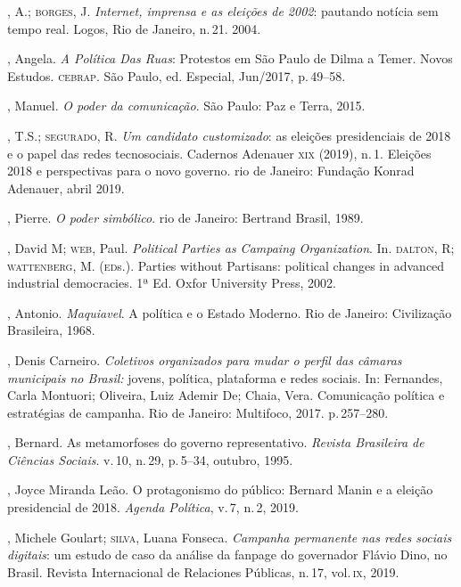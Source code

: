 \begin{bibliohedra}
, A.; \textsc{borges}, J. \textit{Internet, imprensa e as eleições de 2002}:
pautando notícia sem tempo real. Logos, Rio de Janeiro, n.\,21. 2004.

, Angela. \textit{A Política Das Ruas}: Protestos em São Paulo de
Dilma a Temer. Novos Estudos. \textsc{cebrap}. São Paulo, ed. Especial, Jun/2017,
p.\,49--58.

, Manuel. \textit{O poder da comunicação}. São Paulo: Paz e
Terra, 2015.

, T.S.; \textsc{segurado}, R. \textit{Um candidato customizado}: as
eleições presidenciais de 2018 e o papel das redes tecnosociais.
Cadernos Adenauer \textsc{xix} (2019), n.\,1. Eleições 2018 e perspectivas para o
novo governo. rio de Janeiro: Fundação Konrad Adenauer, abril 2019.

, Pierre. \textit{O poder simbólico}. rio de Janeiro: Bertrand
Brasil, 1989.

, David M; \textsc{web}, Paul. \textit{Political Parties as Campaing
Organization}. In. \textsc{dalton}, R; \textsc{wattenberg}, M. (\textsc{ed}s.). Parties without
Partisans: political changes in advanced industrial democracies. 1ª Ed.
Oxfor University Press, 2002.

, Antonio. \textit{Maquiavel}. A política e o Estado Moderno. Rio
de Janeiro: Civilização Brasileira, 1968.

, Denis Carneiro. \textit{Coletivos organizados para mudar o perfil
das câmaras municipais no Brasil:} jovens, política, plataforma e redes
sociais. In: Fernandes, Carla Montuori; Oliveira, Luiz Ademir De; Chaia,
Vera. Comunicação política e estratégias de campanha. Rio de Janeiro:
Multifoco, 2017. p.\,257--280.

, Bernard. As metamorfoses do governo representativo.
\textit{Revista Brasileira de Ciências Sociais}. v.\,10, n.\,29, p.\,5--34,
outubro, 1995.

, Joyce Miranda Leão. O protagonismo do público: Bernard Manin e
a eleição presidencial de 2018. \textit{Agenda Política}, v.\,7, n.\,2,
2019.

, Michele Goulart; \textsc{silva}, Luana Fonseca. \textit{Campanha
permanente nas redes sociais digitais}: um estudo de caso da análise da
fanpage do governador Flávio Dino, no Brasil. Revista Internacional de
Relaciones Públicas, n.\,17, vol.\,\textsc{ix}, 2019.


\end{bibliohedra}
